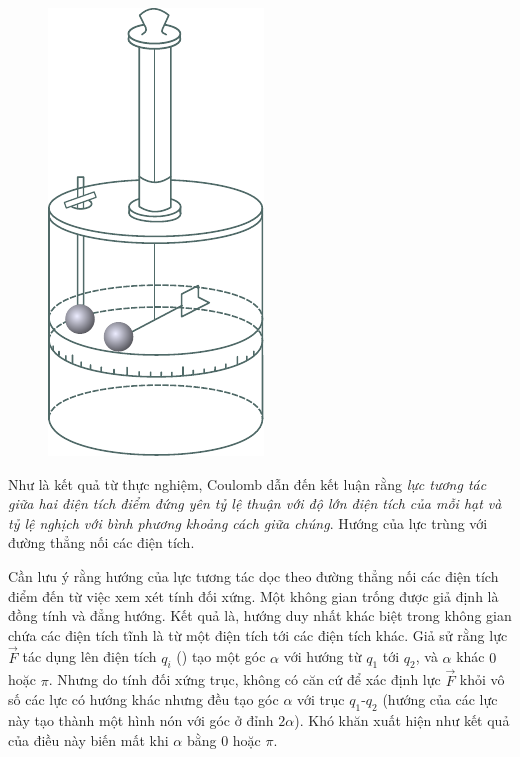 \begin{figure}[!htb]
	\begin{center}
		\includegraphics[scale=0.9]{figures/ch_01/fig_1_1.pdf}
		\caption[]{}
		\label{fig:1_1}
	\end{center}
	\vspace{-0.8cm}
\end{figure}

Như là kết quả từ thực nghiệm, Coulomb dẫn đến kết luận rằng \textit{lực tương tác giữa hai điện tích điểm đứng yên tỷ lệ thuận với độ lớn điện tích của mỗi hạt và tỷ lệ nghịch với bình phương khoảng cách giữa chúng}. Hướng của lực trùng với đường thẳng nối các điện tích.

Cần lưu ý rằng hướng của lực tương tác dọc theo đường thẳng nối các điện tích điểm đến từ việc xem xét tính đối xứng. Một không gian trống được giả định là đồng tính và đẳng hướng. Kết quả là, hướng duy nhất khác biệt trong không gian chứa các điện tích tĩnh là từ một điện tích tới các điện tích khác. Giả sử rằng lực $\vec{F}$ tác dụng lên điện tích $q_i$ () tạo một góc $\alpha$ với hướng từ $q_1$ tới $q_2$, và $\alpha$ khác $0$ hoặc $\pi$. Nhưng do tính đối xứng trục, không có căn cứ để xác định lực  $\vec{F}$ khỏi vô số các lực có hướng khác nhưng đều tạo góc  $\alpha$ với trục $q_1$-$q_2$ (hướng của các lực này tạo thành một hình nón với góc ở đỉnh $2\alpha$). Khó khăn xuất hiện như kết quả của điều này biến mất khi $\alpha$ bằng $0$ hoặc $\pi$.

